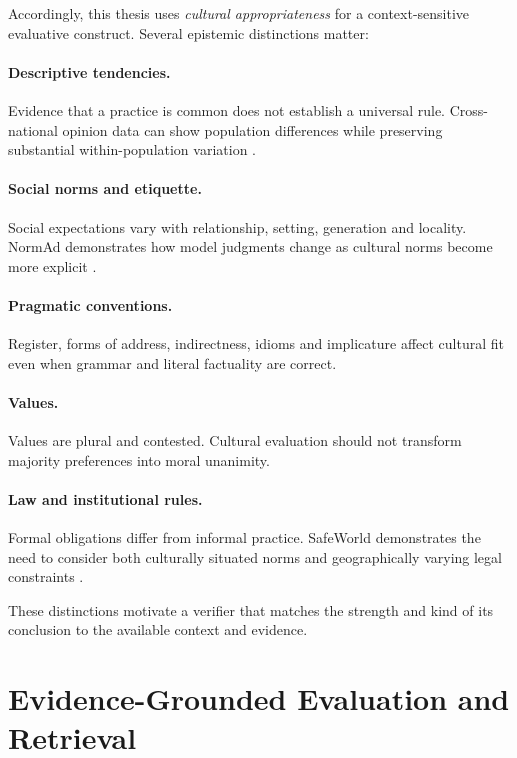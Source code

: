 Accordingly, this thesis uses \emph{cultural appropriateness} for a context-sensitive evaluative construct. Several epistemic distinctions matter:

\paragraph{Descriptive tendencies.} Evidence that a practice is common does not establish a universal rule. Cross-national opinion data can show population differences while preserving substantial within-population variation \parencite{durmus2023globalopinionqa,tao2024culturalbias}.

\paragraph{Social norms and etiquette.} Social expectations vary with relationship, setting, generation and locality. NormAd demonstrates how model judgments change as cultural norms become more explicit \parencite{rao2025normad}.

\paragraph{Pragmatic conventions.} Register, forms of address, indirectness, idioms and implicature affect cultural fit even when grammar and literal factuality are correct.

\paragraph{Values.} Values are plural and contested. Cultural evaluation should not transform majority preferences into moral unanimity.

\paragraph{Law and institutional rules.} Formal obligations differ from informal practice. SafeWorld demonstrates the need to consider both culturally situated norms and geographically varying legal constraints \parencite{yin2024safeworld}.

These distinctions motivate a verifier that matches the strength and kind of its conclusion to the available context and evidence.

\section{Evidence-Grounded Evaluation and Retrieval}

